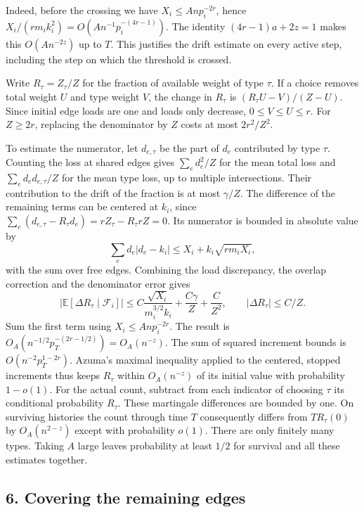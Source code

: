 \documentclass[english,11pt,a4paper]{article}
\begin{document}
Indeed, before the crossing we have \(X_i\le Anp_i^{-2r}\), hence \(X_i/(rm_i k_i^2)=O(An^{-1}p_i^{-(4r-1)})\). The identity \((4r-1)a+2z=1\) makes this \(O(An^{-2z})\) up to \(T\). This justifies the drift estimate on every active step, including the step on which the threshold is crossed.

Write \(R_\tau=Z_\tau/Z\) for the fraction of available weight of type \(\tau\). If a choice removes total weight \(U\) and type weight \(V\), the change in \(R_\tau\) is \((R_\tau U-V)/(Z-U)\). Since initial edge loads are one and loads only decrease, \(0\le V\le U\le r\). For \(Z\ge2r\), replacing the denominator by \(Z\) costs at most \(2r^2/Z^2\).

To estimate the numerator, let \(d_{e,\tau}\) be the part of \(d_e\) contributed by type \(\tau\). Counting the loss at shared edges gives \(\sum_e d_e^2/Z\) for the mean total loss and \(\sum_e d_e d_{e,\tau}/Z\) for the mean type loss, up to multiple intersections. Their contribution to the drift of the fraction is at most \(\gamma/Z\). The difference of the remaining terms can be centered at \(k_i\), since \(\sum_e(d_{e,\tau}-R_\tau d_e)=rZ_\tau-R_\tau rZ=0\). Its numerator is bounded in absolute value by \[\sum_e d_e|d_e-k_i|\le X_i+k_i\sqrt{rm_iX_i},\] with the sum over free edges. Combining the load discrepancy, the overlap correction and the denominator error gives \[|\mathbb E[\Delta R_\tau\mid\mathcal F_i]|
 \le C\frac{\sqrt{X_i}}{m_i^{3/2}k_i}+\frac{C\gamma}{Z}+\frac C{Z^2},
 \qquad |\Delta R_\tau|\le C/Z .\] Sum the first term using \(X_i\le Anp_i^{-2r}\). The result is \(O_A(n^{-1/2}p_T^{-(2r-1/2)})=O_A(n^{-z})\). The sum of squared increment bounds is \(O(n^{-2}p_T^{1-2r})\). Azuma's maximal inequality applied to the centered, stopped increments thus keeps \(R_\tau\) within \(O_A(n^{-z})\) of its initial value with probability \(1-o(1)\). For the actual count, subtract from each indicator of choosing \(\tau\) its conditional probability \(R_\tau\). These martingale differences are bounded by one. On surviving histories the count through time \(T\) consequently differs from \(T R_\tau(0)\) by \(O_A(n^{2-z})\) except with probability \(o(1)\). There are only finitely many types. Taking \(A\) large leaves probability at least \(1/2\) for survival and all these estimates together.

\subsection{6. Covering the remaining edges}\label{covering-the-remaining-edges}
\end{document}
